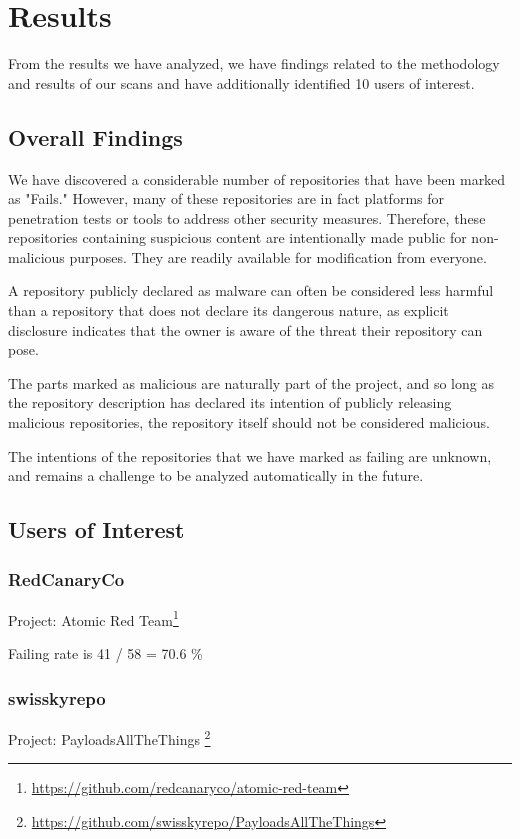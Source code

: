 \documentclass[]{acmart}
\begin{document}
\section{Results}
From the results we have analyzed, we have findings related to the methodology and results of our scans and have additionally identified 10 users of interest.

\subsection{Overall Findings}
We have discovered a considerable number of repositories that have been marked as "Fails." However, many of these repositories are in fact platforms for penetration tests or tools to address other security measures. Therefore, these repositories containing suspicious content are intentionally made public for non-malicious purposes. They are readily available for modification from everyone.

A repository publicly declared as malware can often be considered less harmful than a repository that does not declare its dangerous nature, as explicit disclosure indicates that the owner is aware of the threat their repository can pose.

The parts marked as malicious are naturally part of the project, and so long as the repository description has declared its intention of publicly releasing malicious repositories, the repository itself should not be considered malicious.

The intentions of the repositories that we have marked as failing are unknown, and remains a challenge to be analyzed automatically in the future.

\subsection{Users of Interest}
\subsubsection{RedCanaryCo}
Project: Atomic Red Team\footnote{\url{https://github.com/redcanaryco/atomic-red-team}}

Failing rate is 41 / 58 = 70.6 \%

\subsubsection{swisskyrepo}
Project: PayloadsAllTheThings \footnote{\url{https://github.com/swisskyrepo/PayloadsAllTheThings}}
\end{document}

